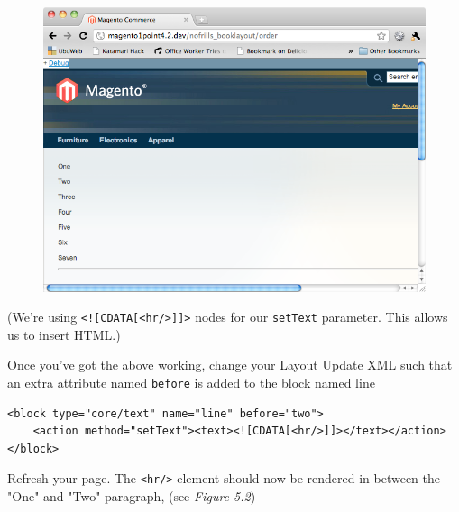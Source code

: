 \documentclass[oneside]{book}
\begin{document}
\begin{figure}[htb]
\begin{center}
\leavevmode
\includegraphics[width=1\textwidth]{images/chapter5/order-base.png}
\end{center}
\caption{}
\end{figure}


(We're using \footnotesize\texttt{\textless ![CDATA[\textless hr/\textgreater ]]\textgreater } \normalsize  nodes for our \footnotesize\texttt{setText} \normalsize  parameter. This allows us to insert HTML.)

Once you've got the above working, change your Layout Update XML such that an extra attribute named \footnotesize\texttt{before} \normalsize  is added to the block named line

\begin{lstlisting}
<block type="core/text" name="line" before="two">
    <action method="setText"><text><![CDATA[<hr/>]]></text></action>
</block>

\end{lstlisting}


Refresh your page.  The \footnotesize\texttt{\textless hr/\textgreater } \normalsize  element should now be rendered in between the "One" and "Two" paragraph, (see \emph{Figure 5.2})
\end{document}
